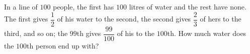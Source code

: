 In a line of $100$ people, the first has $100$ litres of water and the rest have none. The first gives $\dfrac12$ of his water to the second, the second gives $\dfrac23$ of hers to the third, and so on; the $99$th gives $\dfrac{99}{100}$ of his to the $100$th. How much water does the $100$th person end up with?
